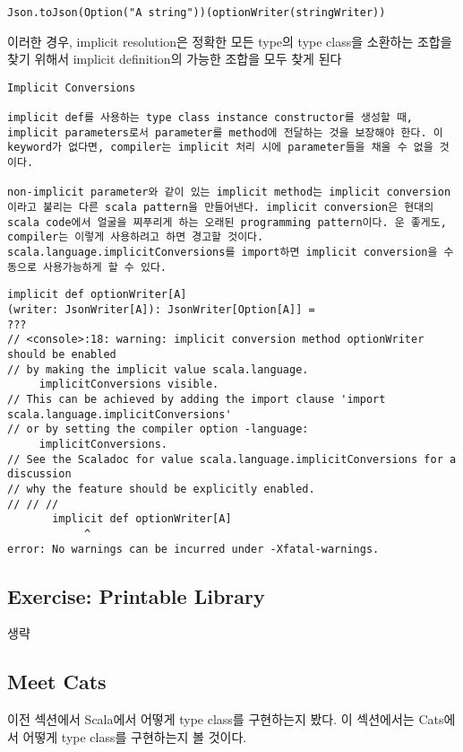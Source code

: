 \documentclass[a4paper]{article}
\begin{document}
\begin{verbatim}
Json.toJson(Option("A string"))(optionWriter(stringWriter))
\end{verbatim}

이러한 경우, implicit resolution은 정확한 모든 type의 type class을 소환하는 조합을 찾기 위해서 implicit definition의 가능한 조합을 모두 찾게 된다

\begin{verbatim}
Implicit Conversions

implicit def를 사용하는 type class instance constructor를 생성할 때, implicit parameters로서 parameter를 method에 전달하는 것을 보장해야 한다. 이 keyword가 없다면, compiler는 implicit 처리 시에 parameter들을 채울 수 없을 것이다.

non-implicit parameter와 같이 있는 implicit method는 implicit conversion이라고 불리는 다른 scala pattern을 만들어낸다. implicit conversion은 현대의 scala code에서 얼굴을 찌푸리게 하는 오래된 programming pattern이다. 운 좋게도, compiler는 이렇게 사용하려고 하면 경고할 것이다. scala.language.implicitConversions를 import하면 implicit conversion을 수동으로 사용가능하게 할 수 있다.

\end{verbatim}

\begin{verbatim}
implicit def optionWriter[A]
(writer: JsonWriter[A]): JsonWriter[Option[A]] =
???
// <console>:18: warning: implicit conversion method optionWriter should be enabled
// by making the implicit value scala.language.
     implicitConversions visible.
// This can be achieved by adding the import clause 'import scala.language.implicitConversions'
// or by setting the compiler option -language:
     implicitConversions.
// See the Scaladoc for value scala.language.implicitConversions for a discussion
// why the feature should be explicitly enabled.
// // //
       implicit def optionWriter[A]
		    ^
error: No warnings can be incurred under -Xfatal-warnings.
\end{verbatim}


\subsection{Exercise: Printable Library}
\label{sec:org431b22a}

생략

\subsection{Meet Cats}
\label{sec:orge90a968}
이전 섹션에서 Scala에서 어떻게 type class를 구현하는지 봤다. 이 섹션에서는 Cats에서 어떻게 type class를 구현하는지 볼 것이다. 
\end{document}
